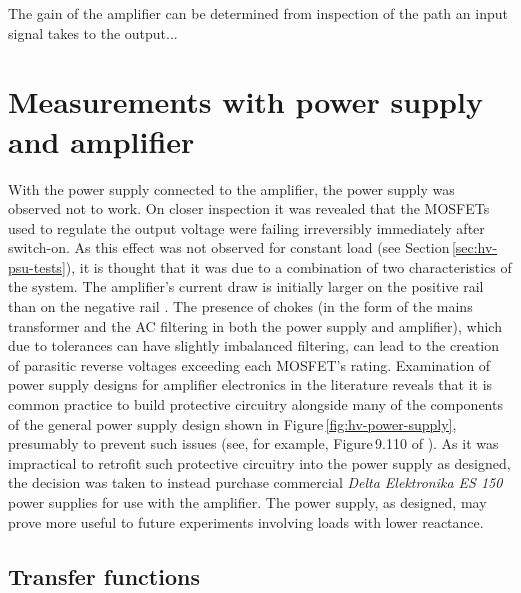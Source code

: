 
The gain of the amplifier can be determined from inspection of the path an input signal takes to the output... 

\section{\label{sec:hv-psu-amp-measurements}Measurements with power supply and amplifier}

With the power supply connected to the amplifier, the power supply was observed not to work. On closer inspection it was revealed that the \gls{MOSFET}s used to regulate the output voltage were failing irreversibly immediately after switch-on. As this effect was not observed for constant load (see Section\,\ref{sec:hv-psu-tests}), it is thought that it was due to a combination of two characteristics of the system. The amplifier's current draw is initially larger on the positive rail than on the negative rail . The presence of chokes (in the form of the mains transformer and the \gls{AC} filtering in both the power supply and amplifier), which due to tolerances can have slightly imbalanced filtering, can lead to the creation of parasitic reverse voltages exceeding each \gls{MOSFET}'s rating. Examination of power supply designs for amplifier electronics in the literature reveals that it is common practice to build protective circuitry alongside many of the components of the general power supply design shown in Figure\,\ref{fig:hv-power-supply}, presumably to prevent such issues (see, for example, Figure\,9.110 of \cite{Horowitz2015}). As it was impractical to retrofit such protective circuitry into the power supply as designed, the decision was taken to instead purchase commercial \emph{Delta Elektronika ES 150} power supplies for use with the amplifier. The power supply, as designed, may prove more useful to future experiments involving loads with lower reactance.

\subsection{Transfer functions}

